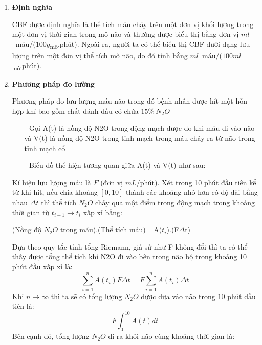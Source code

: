 \documentclass[12pt,a4paper]{article}
\begin{document}
  \begin{enumerate}[a/]
  \item \textbf{Định nghĩa}
 
 \begin{flushleft}
CBF được định nghĩa là thể tích máu chảy trên một đơn vị khối lượng trong
một đơn vị thời gian trong mô não và thường được biểu thị bằng đơn vị $ml$\ máu/($100g$\textsubscript{mô}.phút). 
Ngoài ra, người ta có thể biểu thị CBF dưới dạng lưu lượng trên một đơn vị thể tích mô não, 
do đó tính bằng $ml$\ máu/($100ml$\textsubscript{mô}.phút).
\end{flushleft}
\item \textbf{Phương pháp đo lường}
    \begin{flushleft}

				Phương pháp đo lưu lượng máu não trong đó bệnh nhân được 
				hít một hỗn hợp khí bao gồm chất đánh dấu có chứa $15\%\ N_2O$ \\
        \begin{itemize}
        \item[-] 	Gọi A(t) là nồng độ N2O trong động mạch được đo khi máu đi vào não và V(t) là nồng độ N2O trong tĩnh mạch trong máu chảy ra từ não trong tĩnh mạch cổ\\
        \item[-] 	Biểu đồ thể hiện tương quan giữa A(t) và V(t) như sau: \\
    \end{itemize}
    Kí hiệu lưu lượng máu là $F$ (đơn vị $mL$/phút). Xét trong 10 phút đầu tiên
						kể từ khi hít, nếu chia khoảng $\left[0,10\right]$ thành các khoảng nhỏ hơn có độ dài bằng nhau $\Delta t$ thì 
						thể tích $N_2O$ chảy qua một điểm trong động mạch trong khoảng thời gian từ $t_{i-1} \to t_i$ xấp xỉ bằng: \\
      	\end{flushleft}
      \begin{center}
          (Nồng độ $N_2O$ trong máu).(Thể tích máu)= A($t_i$).(F$\Delta$t)
      \end{center}
      \begin{flushleft}
          Dựa theo quy tắc tính tổng Riemann, giả sử như F không đổi thì ta có thể thấy được tổng thể tích khí N2O đi vào bên trong não bộ trong khoảng 10 phút đầu xấp xỉ là: $$\sum_{i = 1}^{n} A(t_i)F\Delta t = F \sum_{i = 1}^{n} A(t_i) \Delta t$$
          Khi $n \to \infty$ thì ta sẽ có tổng lượng $N_2O$ được đưa vào não trong $10$ phút đầu tiên là:
						$$F \int_{0}^{10} A(t)dt$$
      Bên cạnh đó, tổng lượng $N_2O$ đi ra khỏi não cùng khoảng thời gian là:

\end{flushleft}
\end{enumerate}
\end{document}
